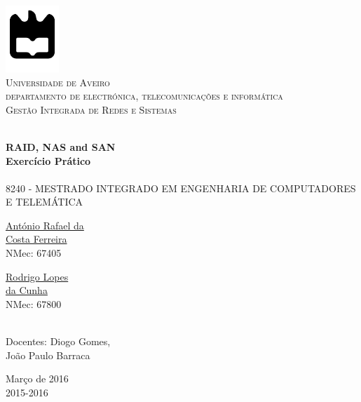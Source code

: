\begin{titlepage}

\begin{center}

\includegraphics[width=0.15\textwidth]{./logo}\\[0.5cm]    

\textsc{\large Universidade de Aveiro \\[1cm]\large departamento de electrónica, telecomunicações e informática}\\[1cm]

\textsc{\large Gestão Integrada de Redes e Sistemas\\[1cm]}

\HRule \\[0.5cm]
{ \huge \bfseries RAID, NAS and SAN}\\[0.4cm]
{ \large \bfseries Exercício Prático}\\[0.4cm]
\HRule \\[1cm]

\textsc{\small{8240 - MESTRADO INTEGRADO EM ENGENHARIA DE COMPUTADORES E TELEMÁTICA}}\\[1cm]

\begin{minipage}{0.4\textwidth}

\begin{flushleft} \large
\href{mailto:rafael.ferreira@ua.pt}{António Rafael da \\ Costa Ferreira }
 \small{\\NMec: 67405}
\end{flushleft}
\end{minipage}
\begin{minipage}{0.4\textwidth}

\begin{flushright} \large
\href{mailto:rodrigocunha@ua.pt}{Rodrigo Lopes \\ da Cunha}
\small{\\NMec: 67800}
\end{flushright}
\end{minipage}\\[1cm]

{\large Docentes: Diogo Gomes,}\\
{\large \hspace{2.5cm} João Paulo Barraca}\\[0.5cm]


\vfill

{\large Março de 2016 \\ 2015-2016}

\end{center}

\end{titlepage}